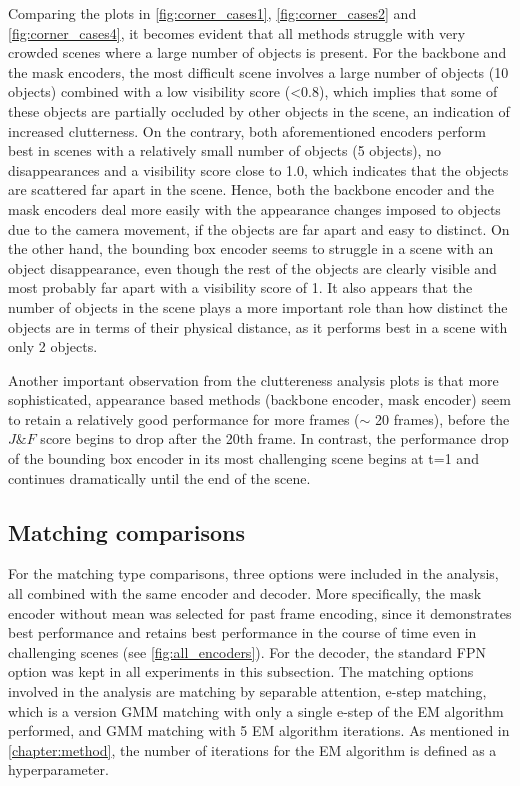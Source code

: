Comparing the plots in \figref\ref{fig:corner_cases1}, \figref\ref{fig:corner_cases2} and \figref\ref{fig:corner_cases4}, it becomes evident that all methods struggle with very crowded scenes where a large number of objects is present. For the backbone and the mask encoders, the most difficult scene involves a large number of objects (10 objects) combined with a low visibility score (<0.8), which implies that some of these objects are partially occluded by other objects in the scene, an indication of increased clutterness. On the contrary, both aforementioned encoders perform best in scenes with a relatively small number of objects (5 objects), no disappearances and a visibility score close to 1.0, which indicates that the objects are scattered far apart in the scene. Hence, both the backbone encoder and the mask encoders deal more easily with the appearance changes imposed to objects due to the camera movement, if the objects are far apart and easy to distinct. On the other hand, the bounding box encoder seems to struggle in a scene with an object disappearance, even though the rest of the objects are clearly visible and most probably far apart with a visibility score of 1. It also appears that the number of objects in the scene plays a more important role than how distinct the objects are in terms of their physical distance, as it performs best in a scene with only 2 objects. \par
\newpage
Another important observation from the cluttereness analysis plots is that more sophisticated, appearance based methods (backbone encoder, mask encoder) seem to retain a relatively good performance for more frames ($\sim$ 20 frames), before the $J\&F$ score begins to drop after the 20th frame. In contrast, the performance drop of the bounding box encoder in its most challenging scene begins at t=1 and continues dramatically until the end of the scene. \par

\subsection{Matching comparisons}


For the matching type comparisons, three options were included in the analysis, all combined with the same encoder and decoder. More specifically, the mask encoder without mean was selected for past frame encoding, since it demonstrates best performance and retains best performance in the course of time even in challenging scenes (see \figref\ref{fig:all_encoders}). For the decoder, the standard FPN option was kept in all experiments in this subsection. The matching options involved in the analysis are matching by separable attention, e-step matching, which is a version GMM matching with only a single e-step of the EM algorithm performed, and GMM matching with 5 EM algorithm iterations. As mentioned in \autoref{chapter:method}, the number of iterations for the EM algorithm is defined as a hyperparameter.\par

